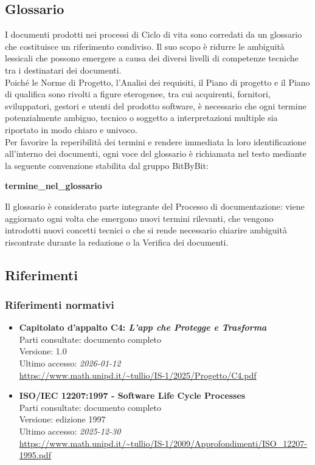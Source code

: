 \documentclass[a4paper,12pt]{article}
\begin{document}
\subsection{Glossario}
I documenti prodotti nei processi di Ciclo di vita sono corredati da un glossario che costituisce un riferimento condiviso. Il suo scopo è ridurre le ambiguità lessicali che possono emergere a causa dei diversi livelli di competenze tecniche tra i destinatari dei documenti. \\Poiché le Norme di Progetto, l’Analisi dei requisiti, il Piano di progetto e il Piano di qualifica sono rivolti a figure eterogenee, tra cui acquirenti, fornitori, sviluppatori, gestori e utenti del prodotto software, è necessario che ogni termine potenzialmente ambiguo, tecnico o soggetto a interpretazioni multiple sia riportato in modo chiaro e univoco.\\Per favorire la reperibilità dei termini e rendere immediata la loro identificazione all’interno dei documenti, ogni voce del glossario è richiamata nel testo mediante la seguente convenzione stabilita dal gruppo BitByBit: 
\begin{center}
    \textbf{termine\_nel\_glossario}
\end{center}
Il glossario è considerato parte integrante del Processo di documentazione: viene aggiornato ogni volta che emergono nuovi termini rilevanti, che vengono introdotti nuovi concetti tecnici o che si rende necessario chiarire ambiguità riscontrate durante la redazione o la Verifica dei documenti.

\subsection{Riferimenti}

\subsubsection{Riferimenti normativi}
\begin{itemize}\raggedright
    \item \textbf{Capitolato d'appalto C4: \emph{L'app che Protegge e Trasforma}}\\
    Parti consultate: documento completo\\
    Versione: 1.0\\
    Ultimo accesso: \textit{2026-01-12}\\
    \url{https://www.math.unipd.it/~tullio/IS-1/2025/Progetto/C4.pdf}
    \item \textbf{ISO/IEC 12207:1997 - Software Life Cycle Processes}\\
    Parti consultate: documento completo\\
    Versione: edizione 1997\\
    Ultimo accesso: \textit{2025-12-30}\\
    \url{https://www.math.unipd.it/~tullio/IS-1/2009/Approfondimenti/ISO_12207-1995.pdf}
\end{itemize}
\end{document}
